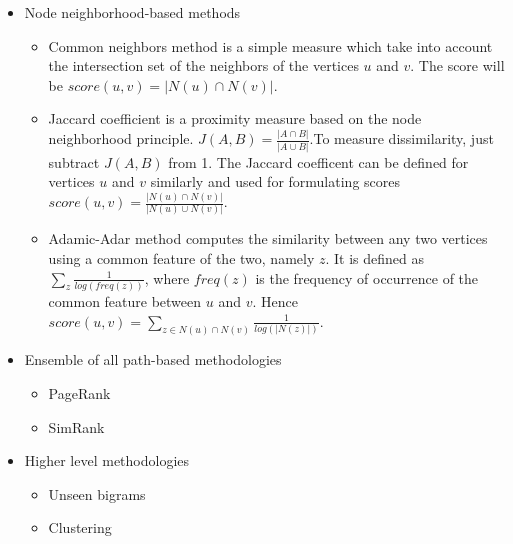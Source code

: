 \documentclass[14pt]{article}
\begin{document}
\begin{enumerate}
\begin{itemize}
         \begin{itemize}
          \item Node neighborhood-based methods
           \begin{itemize}
            \item Common neighbors method is a simple measure which take into account the intersection set of the neighbors of the vertices $u$ and $v$. The score will be $score (u,v) = |N(u) \cap N(v)|$.
            \item Jaccard coefficient is a proximity measure based on the node neighborhood principle. $J(A,B) = \frac{|A \cap B|}{|A \cup B|}$.To measure dissimilarity, just subtract $J(A,B)$ from 1. The Jaccard coefficent can be defined for vertices $u$ and $v$ similarly and used for formulating scores $score(u,v) = \frac{|N(u) \cap N(v)|}{|N(u) \cup N(v)|}$.
            \item Adamic-Adar method computes the similarity between any two vertices using a common feature of the two, namely $z$. It is defined as $\sum_z \frac{1}{log(freq(z))}$, where $freq(z)$ is the frequency of occurrence of the common feature between $u$ and $v$. Hence $score(u,v) = \sum_{z \in N(u) \cap N(v)} \frac{1}{log(|N(z)|)}$.
           \end{itemize}
           
           \item Ensemble of all path-based methodologies
            \begin{itemize}
             \item PageRank
             \item SimRank
            \end{itemize}
            
            \item Higher level methodologies
             \begin{itemize}
              \item Unseen bigrams
              \item Clustering
             \end{itemize}
         \end{itemize}
      \end{itemize}
\end{enumerate}
\end{document}
